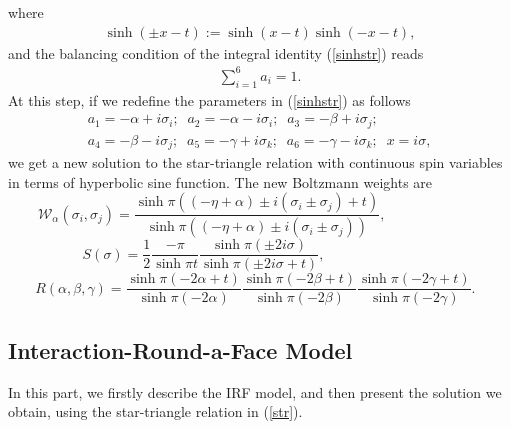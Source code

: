 \documentclass[a4paper,11pt]{article}%
\numberwithin{equation}{section}
\begin{document}
where 
\begin{align}
   \sinh(\pm x-t):=\sinh(x-t)\sinh(-x-t),
\end{align}
and the balancing condition of the integral identity (\ref{sinhstr}) reads
\begin{align}
    \sum_{i=1}^6 a_i=1.
\end{align}
At this step, if we redefine the parameters in (\ref{sinhstr}) as follows 
\begin{align}
  a_1=-\alpha+i\sigma_i;\;\; a_2=-\alpha-i\sigma_i;\;\; a_3=-\beta+i\sigma_j;\\ \nonumber
     a_4=-\beta-i\sigma_j;\;\; a_5=-\gamma+i\sigma_k;\;\; a_6=-\gamma-i\sigma_k; \;\; x=i\sigma,
\end{align}
we get a new solution to the star-triangle relation with continuous spin variables in terms of hyperbolic sine function. The new Boltzmann weights are
\begin{equation}
   \mathcal{W}_\alpha(\sigma_i,\sigma_j)=\frac{\sinh\pi((-\eta+\alpha)\pm i(\sigma_i\pm\sigma_j)+t)}{\sinh\pi((-\eta+\alpha)\pm i(\sigma_i\pm\sigma_j))},\qquad\qquad\qquad\,\,\,\,\,
\end{equation}
\begin{equation}
    S(\sigma)=\frac 12 \frac{-\pi}{\sinh\pi t}\frac{\sinh\pi(\pm 2 i\sigma) }{\sinh \pi(\pm 2i\sigma+t)}, \qquad \qquad\qquad\qquad
    \end{equation}
\begin{equation}
  R(\alpha,\beta,\gamma) =\frac{\sinh\pi(-2\alpha+t)}{\sinh\pi(-2\alpha)}\frac{\sinh\pi(-2\beta+t)}{\sinh\pi(-2\beta)}\frac{\sinh\pi(-2 \gamma+t)}{\sinh\pi(-2\gamma)}.\,\,\,\,
\end{equation}



\subsection{Interaction-Round-a-Face Model}
\linespread{0.5}
In this part, we firstly describe the IRF model, and then present the solution we obtain, using the star-triangle relation in (\ref{str}).
\end{document}
